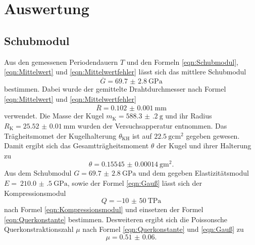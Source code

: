 \newpage
\section{Auswertung}
\label{sec:Auswertung}
\subsection{Schubmodul}
\label{sec:Schubmodul}
Aus den gemessenen Periodendauern $T$ und den Formeln \eqref{eqn:Schubmodul},
\eqref{eqn:Mittelwert} und \eqref{eqn:Mittelwertfehler}
lässt sich das mittlere Schubmodul
\begin{equation*}
  \overline{G} = \SI{69.7(28)}{\giga\pascal}
\end{equation*}
bestimmen. Dabei wurde der gemittelte Drahtdurchmesser nach Formel
 \eqref{eqn:Mittelwert} und \eqref{eqn:Mittelwertfehler}
\begin{equation*}
  \overline{R} = \SI{0.102(1)}{\milli\meter}
\end{equation*}
verwendet. Die Masse der Kugel $m_\text{K} = \SI{588.3(2)}{\gram}$ und ihr
Radius $R_\text{K} = \SI{25.52(1)}{\milli\meter}$ wurden der
Versuchsapperatur entnommen. Das Trägheitsmomet der Kugelhalterung $\theta_\text{KH}$
ist auf $\SI{22.5}{\gram\centi\meter\squared}$ gegeben gewesen. Damit ergibt
sich das Gesamtträgheitsmoment $\theta$ der Kugel und ihrer Halterung zu
\begin{equation*}
  \theta = \SI{0.15545(14)}{\gram\meter\squared}.
\end{equation*}
Aus dem Schubmodul $G = \SI{69.7(28)}{\giga\pascal}$ und dem gegeben
Elastizitätsmodul \\
$E =~\SI{210.0(5)}{\giga\pascal}$,
sowie der Formel \eqref{eqn:Gauß} lässt sich der Kompressionsmodul
\begin{equation*}
  Q = \SI{-10(50)}{\tera\pascal}
\end{equation*}
nach Formel \eqref{eqn:Kompressionsmodul} und einsetzen der Formel \eqref{eqn:Querkonstante} bestimmen.
Desweiteren ergibt sich die Poissonsche Querkonstraktionszahl $\mu$ nach Formel
\eqref{eqn:Querkonstante} und \eqref{eqn:Gauß} zu
\begin{equation}
  \mu = \num{0.51(6)}.
\end{equation}




